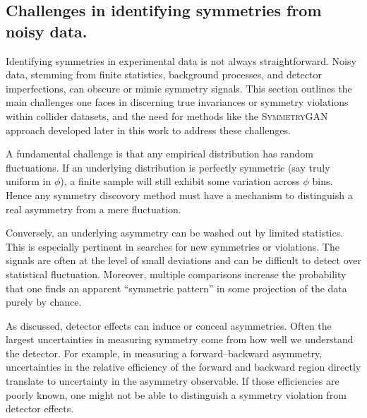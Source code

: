     \subsection{Challenges in identifying symmetries from noisy data.}
    \label{subsec:noisy-symmetries}
        Identifying symmetries in experimental data is not always straightforward.
        Noisy data, stemming from finite statistics, background processes, and detector imperfections, can obscure or mimic symmetry signals.
        This section outlines the main challenges one faces in discerning true invariances or symmetry violations within collider datasets, and the need for methods like the \textsc{SymmetryGAN} approach developed later in this work to address these challenges.

        A fundamental challenge is that any empirical distribution has random fluctuations.
        If an underlying distribution is perfectly symmetric (say truly uniform in $\phi$), a finite sample will still exhibit some variation across $\phi$ bins.
        Hence any symmetry discovory method must have a mechanism to distinguish a real asymmetry from a mere fluctuation.
        
        Conversely, an underlying asymmetry can be washed out by limited statistics.
        This is especially pertinent in searches for new symmetries or violations.
        The signals are often at the level of small deviations and can be difficult to detect over statistical fluctuation.
        Moreover, multiple comparisons increase the probability that one finds an apparent ``symmetric pattern'' in some projection of the data purely by chance.

        As discussed, detector effects can induce or conceal asymmetries.
        Often the largest uncertainties in measuring symmetry come from how well we understand the detector.
        For example, in measuring a forward--backward asymmetry, uncertainties in the relative efficiency of the forward and backward region directly translate to uncertainty in the asymmetry observable.
        If those efficiencies are poorly known, one might not be able to distinguish a symmetry violation from detector effects.
        
